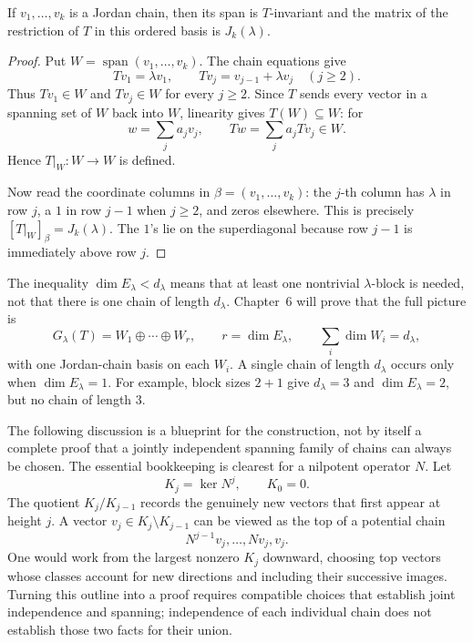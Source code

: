 \begin{proposition}
If \(v_1,\ldots,v_k\) is a Jordan chain, then its span is \(T\)-invariant
and the matrix of the restriction of \(T\) in this ordered basis is
\(J_k(\lambda)\).
\end{proposition}
\begin{proof}
Put \(W=\operatorname{span}(v_1,\ldots,v_k)\). The chain equations give
\[
Tv_1=\lambda v_1,\qquad
Tv_j=v_{j-1}+\lambda v_j\quad(j\geq2).
\]
Thus \(Tv_1\in W\) and \(Tv_j\in W\) for every \(j\geq2\). Since \(T\)
sends every vector in a spanning set of \(W\) back into \(W\), linearity
gives \(T(W)\subseteq W\): for
\[
w=\sum_ja_jv_j,
\qquad
Tw=\sum_ja_jTv_j\in W.
\]
Hence
\(T|_W:W\to W\) is defined.

Now read the coordinate columns in \(\beta=(v_1,\ldots,v_k)\):
the \(j\)-th column has \(\lambda\) in row \(j\), a \(1\) in row \(j-1\)
when \(j\geq2\), and zeros elsewhere.  This is precisely
\([T|_W]_\beta=J_k(\lambda)\). The \(1\)'s lie on the superdiagonal because
row \(j-1\) is immediately above row \(j\).
\end{proof}

The inequality \(\dim E_\lambda<d_\lambda\) means that at least one
nontrivial \(\lambda\)-block is needed, not that there is one chain of length
\(d_\lambda\). Chapter~6 will prove that the full picture is
\[
G_\lambda(T)=W_1\oplus\cdots\oplus W_r,
\qquad r=\dim E_\lambda,\qquad
\sum_i\dim W_i=d_\lambda,
\]
with one Jordan-chain basis on each \(W_i\). A single chain of length
\(d_\lambda\) occurs only when \(\dim E_\lambda=1\). For example, block
sizes \(2+1\) give \(d_\lambda=3\) and \(\dim E_\lambda=2\), but no chain
of length \(3\).

The following discussion is a blueprint for the construction, not by itself
a complete proof that a jointly independent spanning family of chains can
always be chosen.  The essential bookkeeping is clearest for a nilpotent
operator \(N\).
Let
\[
K_j=\ker N^j,\qquad K_0=0.
\]
The quotient \(K_j/K_{j-1}\) records the genuinely new vectors that first
appear at height \(j\).  A vector \(v_j\in K_j\setminus K_{j-1}\) can be
viewed as the top of a potential chain
\[
N^{j-1}v_j,\ldots,Nv_j,v_j.
\]
One would work from the largest nonzero \(K_j\) downward, choosing top vectors
whose classes account for new directions and including their successive
images.  Turning this outline into a proof requires compatible choices that
establish joint independence and spanning; independence of each individual
chain does not establish those two facts for their union.


